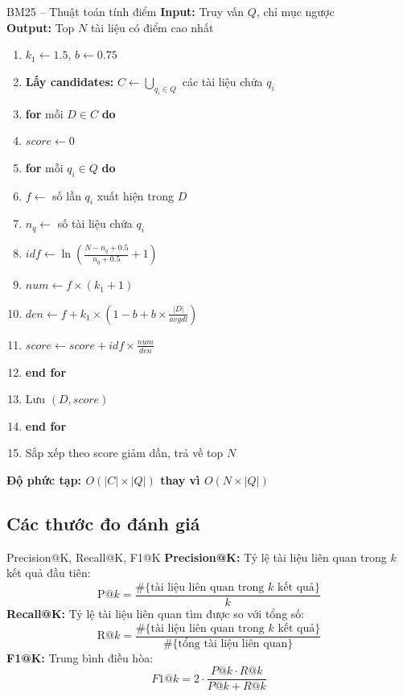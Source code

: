 \documentclass[serif, aspectratio=169]{beamer}
\newcommand{\green}[1]{\textbf{\color{codegreen}#1}}
\begin{document}
\begin{frame}{BM25 -- Thuật toán tính điểm}
\footnotesize
\textbf{Input:} Truy vấn $Q$, chỉ mục ngược\\
\textbf{Output:} Top $N$ tài liệu có điểm cao nhất
\begin{enumerate}
    \item $k_1 \leftarrow 1.5$, $b \leftarrow 0.75$
    \item \textbf{Lấy candidates:} $C \leftarrow \bigcup_{q_i \in Q}$ các tài liệu chứa $q_i$
    \item \textbf{for} mỗi $D \in C$ \textbf{do}
    \item \quad $score \leftarrow 0$
    \item \quad \textbf{for} mỗi $q_i \in Q$ \textbf{do}
    \item \quad \quad $f \leftarrow$ số lần $q_i$ xuất hiện trong $D$
    \item \quad \quad $n_q \leftarrow$ số tài liệu chứa $q_i$
    \item \quad \quad $idf \leftarrow \ln\left(\frac{N - n_q + 0.5}{n_q + 0.5} + 1\right)$
    \item \quad \quad $num \leftarrow f \times (k_1 + 1)$
    \item \quad \quad $den \leftarrow f + k_1 \times (1 - b + b \times \frac{|D|}{avgdl})$
    \item \quad \quad $score \leftarrow score + idf \times \frac{num}{den}$
    \item \quad \textbf{end for}
    \item \quad Lưu $(D, score)$
    \item \textbf{end for}
    \item Sắp xếp theo score giảm dần, trả về top $N$
\end{enumerate}
\vspace{0.3cm}
\green{Độ phức tạp: $O(|C| \times |Q|)$ thay vì $O(N \times |Q|)$}
\end{frame}

\subsection{Các thước đo đánh giá}
\begin{frame}{Precision@K, Recall@K, F1@K}
\textbf{Precision@K:} Tỷ lệ tài liệu liên quan trong $k$ kết quả đầu tiên:
\[
\mathrm{P}@k = \frac{\#\{\text{tài liệu liên quan trong } k \text{ kết quả}\}}{k}
\]
\textbf{Recall@K:} Tỷ lệ tài liệu liên quan tìm được so với tổng số:
\[
\mathrm{R}@k = \frac{\#\{\text{tài liệu liên quan trong } k \text{ kết quả}\}}{\#\{\text{tổng tài liệu liên quan}\}}
\]
\textbf{F1@K:} Trung bình điều hòa:
\[
F1@k = 2 \cdot \frac{P@k \cdot R@k}{P@k + R@k}
\]
\end{frame}
\end{document}
